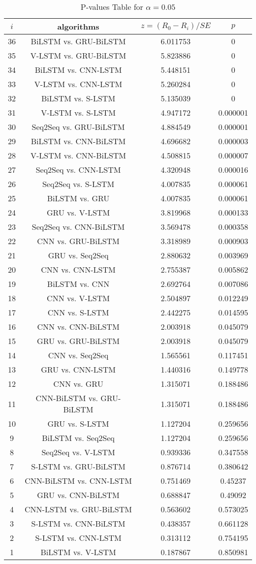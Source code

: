 \documentclass[a4paper,10pt]{article}
\begin{document}
\begin{landscape}
\begin{table}[!htp]
\centering\scriptsize
\begin{tabular}{cccc}
$i$&algorithms&$z=(R_0 - R_i)/SE$&$p$\\
\hline36&BiLSTM vs. GRU-BiLSTM&6.011753&0\\
35&V-LSTM vs. GRU-BiLSTM&5.823886&0\\
34&BiLSTM vs. CNN-LSTM&5.448151&0\\
33&V-LSTM vs. CNN-LSTM&5.260284&0\\
32&BiLSTM vs. S-LSTM&5.135039&0\\
31&V-LSTM vs. S-LSTM&4.947172&0.000001\\
30&Seq2Seq vs. GRU-BiLSTM&4.884549&0.000001\\
29&BiLSTM vs. CNN-BiLSTM&4.696682&0.000003\\
28&V-LSTM vs. CNN-BiLSTM&4.508815&0.000007\\
27&Seq2Seq vs. CNN-LSTM&4.320948&0.000016\\
26&Seq2Seq vs. S-LSTM&4.007835&0.000061\\
25&BiLSTM vs. GRU&4.007835&0.000061\\
24&GRU vs. V-LSTM&3.819968&0.000133\\
23&Seq2Seq vs. CNN-BiLSTM&3.569478&0.000358\\
22&CNN vs. GRU-BiLSTM&3.318989&0.000903\\
21&GRU vs. Seq2Seq&2.880632&0.003969\\
20&CNN vs. CNN-LSTM&2.755387&0.005862\\
19&BiLSTM vs. CNN&2.692764&0.007086\\
18&CNN vs. V-LSTM&2.504897&0.012249\\
17&CNN vs. S-LSTM&2.442275&0.014595\\
16&CNN vs. CNN-BiLSTM&2.003918&0.045079\\
15&GRU vs. GRU-BiLSTM&2.003918&0.045079\\
14&CNN vs. Seq2Seq&1.565561&0.117451\\
13&GRU vs. CNN-LSTM&1.440316&0.149778\\
12&CNN vs. GRU&1.315071&0.188486\\
11&CNN-BiLSTM vs. GRU-BiLSTM&1.315071&0.188486\\
10&GRU vs. S-LSTM&1.127204&0.259656\\
9&BiLSTM vs. Seq2Seq&1.127204&0.259656\\
8&Seq2Seq vs. V-LSTM&0.939336&0.347558\\
7&S-LSTM vs. GRU-BiLSTM&0.876714&0.380642\\
6&CNN-BiLSTM vs. CNN-LSTM&0.751469&0.45237\\
5&GRU vs. CNN-BiLSTM&0.688847&0.49092\\
4&CNN-LSTM vs. GRU-BiLSTM&0.563602&0.573025\\
3&S-LSTM vs. CNN-BiLSTM&0.438357&0.661128\\
2&S-LSTM vs. CNN-LSTM&0.313112&0.754195\\
1&BiLSTM vs. V-LSTM&0.187867&0.850981\\
\hline
\end{tabular}
\caption{P-values Table for $\alpha=0.05$}
\end{table}\pagebreak


\end{landscape}
\end{document}
